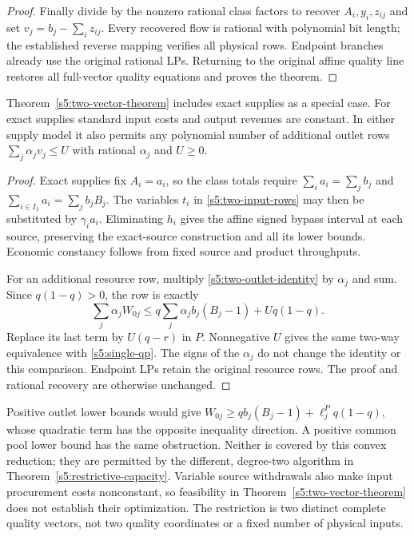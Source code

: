 \begin{proof}
Finally divide by the nonzero rational class factors to recover
$A_i,y_i,z_{ij}$ and set $v_j=b_j-\sum_i z_{ij}$. Every recovered flow
is rational with polynomial bit length; the established reverse mapping
verifies all physical rows. Endpoint branches already use the original
rational LPs. Returning to the original affine quality line restores
all full-vector quality equations and proves the theorem.
\end{proof}

\begin{corollary}
\label{s5:two-vector-extensions}
Theorem~\ref{s5:two-vector-theorem} includes exact supplies as a special
case. For exact supplies standard input costs and output revenues are
constant. In either supply model it also permits any polynomial number
of additional outlet rows $\sum_j\alpha_jv_j\le U$ with rational
$\alpha_j$ and $U\ge0$.
\end{corollary}
\begin{proof}
Exact supplies fix $A_i=a_i$, so the class totals require
$\sum_i a_i=\sum_jb_j$ and $\sum_{i\in I_1}a_i=\sum_jb_jB_j$.
The variables $t_i$ in \eqref{s5:two-input-rows} may then be substituted
by $\gamma_i a_i$. Eliminating $h_i$ gives the affine signed bypass
interval at each source, preserving the exact-source construction and
all its lower bounds. Economic constancy follows from fixed source and
product throughputs.

For an additional resource row, multiply
\eqref{s5:two-outlet-identity} by $\alpha_j$ and sum. Since $q(1-q)>0$,
the row is exactly
\[
 \sum_j\alpha_jW_{0j}\le
 q\sum_j\alpha_jb_j(B_j-1)+Uq(1-q).
\]
Replace its last term by $U(q-r)$ in $P$. Nonnegative $U$ gives the
same two-way equivalence with \eqref{s5:single-qp}. The signs of the
$\alpha_j$ do not change the identity or this comparison. Endpoint LPs
retain the original resource rows. The proof and rational recovery are
otherwise unchanged.
\end{proof}

Positive outlet lower bounds would give
$W_{0j}\ge qb_j(B_j-1)+\ell_j^P q(1-q)$, whose quadratic term has the
opposite inequality direction. A positive common pool lower bound has
the same obstruction. Neither is covered by this convex reduction;
they are permitted by the different, degree-two algorithm in
Theorem~\ref{s5:restrictive-capacity}. Variable source withdrawals also
make input procurement costs nonconstant, so feasibility in
Theorem~\ref{s5:two-vector-theorem} does not establish their optimization.
The restriction is two distinct complete quality vectors, not two
quality coordinates or a fixed number of physical inputs.

